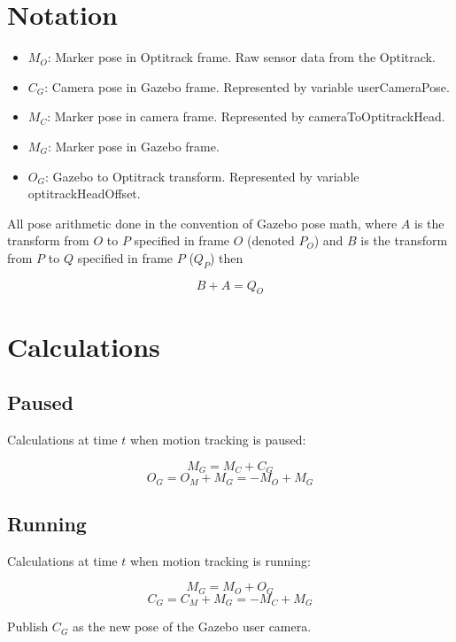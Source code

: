\documentclass[11pt, letterpaper]{article}
\begin{document}
\section{Notation}
\begin{itemize}
\item $M_O$: Marker pose in Optitrack frame. Raw sensor data from the Optitrack.

\item $C_G$: Camera pose in Gazebo frame. Represented by variable userCameraPose.

\item $M_C$: Marker pose in camera frame. Represented by cameraToOptitrackHead.

\item $M_G$: Marker pose in Gazebo frame.

\item $O_G$: Gazebo to Optitrack transform. Represented by variable optitrackHeadOffset.
\end{itemize}

All pose arithmetic done in the convention of Gazebo pose math, where $A$ is
the transform from $O$ to $P$ specified in frame $O$ (denoted $P_O$) and $B$
is the transform from $P$ to $Q$ specified in frame $P$ ($Q_P$) then

\begin{equation}
B + A = Q_O
\end{equation}

\section{Calculations}
\subsection{Paused}
Calculations at time $t$ when motion tracking is paused:

\begin{equation}
M_G = M_C + C_G
\end{equation}
\begin{equation}
O_G = O_M + M_G = -M_O + M_G
\end{equation}

\subsection{Running}
Calculations at time $t$ when motion tracking is running:

\begin{equation}
M_G = M_O + O_G
\end{equation}
\begin{equation}
C_G = C_M + M_G = -M_C + M_G
\end{equation}

Publish $C_G$ as the new pose of the Gazebo user camera.
\end{document}
